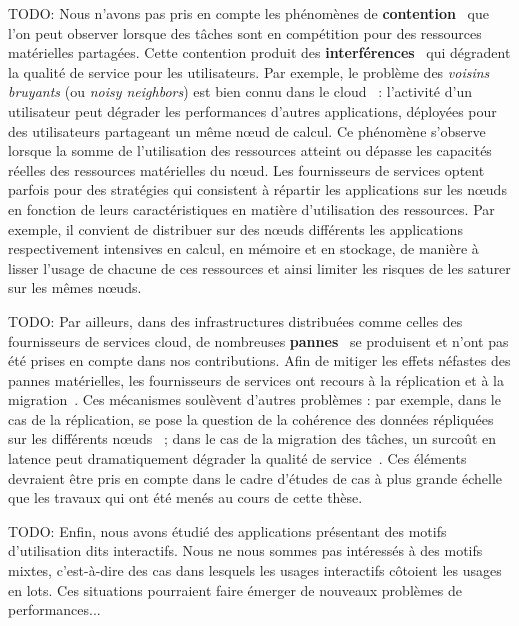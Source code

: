 TODO: Nous n'avons pas pris en compte les phénomènes de \textbf{contention}~\cite{vanbeekCPUContentionPredictor2019, jacquetSweetspotVMOversubscribingCPU} que l'on peut observer lorsque des tâches sont en compétition pour des ressources matérielles partagées. Cette contention produit des \textbf{interférences}~\cite{kohAnalysisPerformanceInterference2007} \cite{vardasImprovedParallelApplication} qui dégradent la qualité de service pour les utilisateurs. Par exemple, le problème des \textit{voisins bruyants} (ou \textit{noisy neighbors}) est bien connu dans le cloud~\cite{robbagbyAntimodeleVoisinBruyant} : l'activité d'un utilisateur peut dégrader les performances d'autres applications, déployées pour des utilisateurs partageant un même nœud de calcul. Ce phénomène s'observe lorsque la somme de l'utilisation des ressources atteint ou dépasse les capacités réelles des ressources matérielles du nœud. Les fournisseurs de services optent parfois pour des stratégies qui consistent à répartir les applications sur les nœuds en fonction de leurs caractéristiques en matière d'utilisation des ressources. Par exemple, il convient de distribuer sur des nœuds différents les applications respectivement intensives en calcul, en mémoire et en stockage, de manière à lisser l'usage de chacune de ces ressources et ainsi limiter les risques de les saturer sur les mêmes nœuds.

TODO: Par ailleurs, dans des infrastructures distribuées comme celles des fournisseurs de services cloud, de nombreuses \textbf{pannes}~\cite{javadiFailureTraceArchive2013, galletModelSpaceCorrelatedFailures2010} se produisent et n'ont pas été prises en compte dans nos contributions. Afin de mitiger les effets néfastes des pannes matérielles, les fournisseurs de services ont recours à la réplication et à la migration~\cite{}. Ces mécanismes soulèvent d'autres problèmes : par exemple, dans le cas de la réplication, se pose la question de la cohérence des données répliquées sur les différents nœuds~\cite{} ; dans le cas de la migration des tâches, un surcoût en latence peut dramatiquement dégrader la qualité de service~\cite{}. Ces éléments devraient être pris en compte dans le cadre d'études de cas à plus grande échelle que les travaux qui ont été menés au cours de cette thèse.

TODO: Enfin, nous avons étudié des applications présentant des motifs d'utilisation dits interactifs. Nous ne nous sommes pas intéressés à des motifs mixtes, c'est-à-dire des cas dans lesquels les usages interactifs côtoient les usages en lots. Ces situations pourraient faire émerger de nouveaux problèmes de performances...

